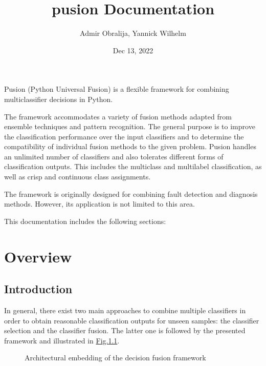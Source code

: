 \documentclass[letterpaper,10pt,english]{sphinxmanual}
\title{pusion Documentation}
\date{Dec 13, 2022}
\author{Admir Obralija, Yannick Wilhelm}
\begin{document}
\pagestyle{empty}
\sphinxmaketitle
\pagestyle{plain}
\sphinxtableofcontents
\pagestyle{normal}
\label{\detokenize{index::doc}}


\sphinxAtStartPar
Pusion (Python Universal Fusion) is a flexible framework for combining multi\sphinxhyphen{}classifier decisions in Python.

\sphinxAtStartPar
The framework accommodates a variety of fusion methods adapted from ensemble techniques and pattern recognition.
The general purpose is to improve the classification performance over the input classifiers and to determine the
compatibility of individual fusion methods to the given problem.
Pusion handles an unlimited number of classifiers and also tolerates different forms of classification outputs.
This includes the multiclass and multilabel classification, as well as crisp and continuous class assignments.

\sphinxAtStartPar
The framework is originally designed for combining fault detection and diagnosis methods.
However, its application is not limited to this area.

\sphinxAtStartPar
This documentation includes the following sections:


\chapter{Overview}
\label{\detokenize{overview:overview}}\label{\detokenize{overview::doc}}

\section{Introduction}
\label{\detokenize{overview:introduction}}
\sphinxAtStartPar
In general, there exist two main approaches to combine multiple classifiers in order to obtain reasonable classification
outputs for unseen samples: the classifier selection and the classifier fusion.
The latter one is followed by the presented framework and illustrated in \hyperref[\detokenize{overview:fig-context}]{Fig.\@ \ref{\detokenize{overview:fig-context}}}.

\begin{figure}[htbp]
\centering
\capstart

\noindent{}
\caption{Architectural embedding of the decision fusion framework}\label{\detokenize{overview:id1}}\label{\detokenize{overview:fig-context}}\end{figure}
\end{document}
